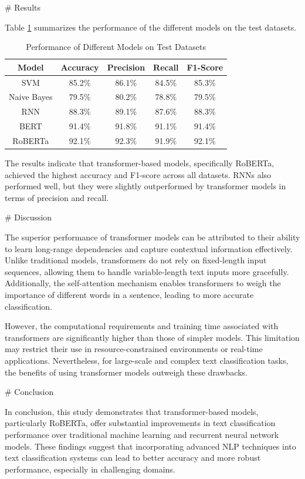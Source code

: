 # Results

Table \ref{tab:results} summarizes the performance of the different models on the test datasets.

\begin{table}[htbp]
    \centering
    \caption{Performance of Different Models on Test Datasets}
    \label{tab:results}
    \begin{tabular}{|c|c|c|c|c|}
    \hline
    Model & Accuracy & Precision & Recall & F1-Score \\
    \hline
    SVM & 85.2\% & 86.1\% & 84.5\% & 85.3\% \\
    Naive Bayes & 79.5\% & 80.2\% & 78.8\% & 79.5\% \\
    RNN & 88.3\% & 89.1\% & 87.6\% & 88.3\% \\
    BERT & 91.4\% & 91.8\% & 91.1\% & 91.4\% \\
    RoBERTa & 92.1\% & 92.3\% & 91.9\% & 92.1\% \\
    \hline
    \end{tabular}
\end{table}

The results indicate that transformer-based models, specifically RoBERTa, achieved the highest accuracy and F1-score across all datasets. RNNs also performed well, but they were slightly outperformed by transformer models in terms of precision and recall.

# Discussion

The superior performance of transformer models can be attributed to their ability to learn long-range dependencies and capture contextual information effectively. Unlike traditional models, transformers do not rely on fixed-length input sequences, allowing them to handle variable-length text inputs more gracefully. Additionally, the self-attention mechanism enables transformers to weigh the importance of different words in a sentence, leading to more accurate classification.

However, the computational requirements and training time associated with transformers are significantly higher than those of simpler models. This limitation may restrict their use in resource-constrained environments or real-time applications. Nevertheless, for large-scale and complex text classification tasks, the benefits of using transformer models outweigh these drawbacks.

# Conclusion

In conclusion, this study demonstrates that transformer-based models, particularly RoBERTa, offer substantial improvements in text classification performance over traditional machine learning and recurrent neural network models. These findings suggest that incorporating advanced NLP techniques into text classification systems can lead to better accuracy and more robust performance, especially in challenging domains.

